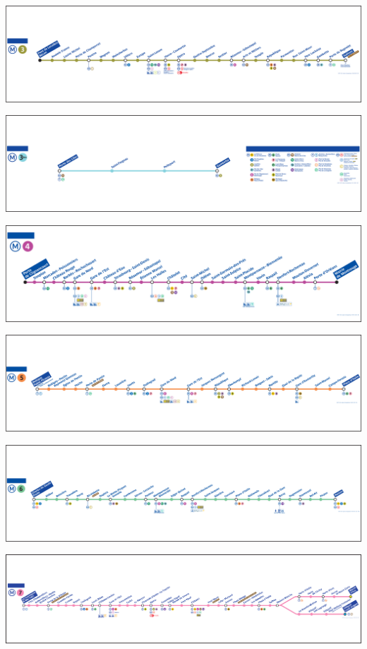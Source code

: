 \documentclass[,french]{article}
\begin{document}
\includegraphics{img/plan_lignes/plan-de-ligne_metro_ligne-3.pdf}

\includegraphics{img/plan_lignes/plan-de-ligne_metro_ligne-3b.pdf}

\includegraphics{img/plan_lignes/plan-de-ligne_metro_ligne-4.pdf}

\includegraphics{img/plan_lignes/plan-de-ligne_metro_ligne-5.pdf}

\includegraphics{img/plan_lignes/plan-de-ligne_metro_ligne-6.pdf}

\includegraphics{img/plan_lignes/plan-de-ligne_metro_ligne-7.pdf}
\end{document}
